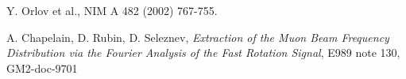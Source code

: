 \begin{thebibliography}{}

Y. Orlov et al., NIM A 482 (2002) 767-755.

A. Chapelain, D. Rubin, D. Seleznev, \textit{Extraction of the Muon Beam Frequency Distribution via the Fourier Analysis of the Fast Rotation Signal}, E989 note 130, 
GM2-doc-9701

\end{thebibliography}
